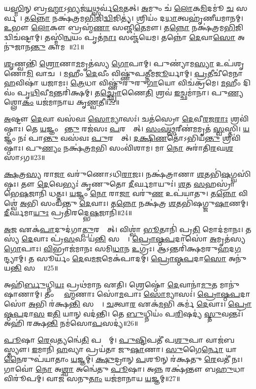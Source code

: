 𑌯\ul{𑌸𑍍𑌮𑌿}𑌨𑍍 𑌬𑍍𑌰\ul{𑌹𑍍𑌮𑌾}\-𑌽𑌭𑍍𑌯𑌜॑\ul{𑌯}𑌥𑍍𑌸𑌰𑍍𑌵॑\ul{𑌮𑍇}𑌤𑌤𑍍।
\ul{𑌅}𑌮𑍁𑌂 𑌚॑ \ul{𑌲𑍋}𑌕\ul{𑌮𑌿}𑌦𑌮𑍂॑ \ul{𑌚} 𑌸𑌰𑍍𑌵𑌮𑍍᳚।
𑌤\ul{𑌨𑍍𑌨𑍋} 𑌨𑌕𑍍𑌷॑𑌤𑍍𑌰𑌮\ul{𑌭𑌿}𑌜𑌿\ul{𑌦𑍍𑌵𑌿}𑌜𑌿𑌤𑍍𑌯॑।
𑌶𑍍𑌰𑌿𑌯𑌂॑ 𑌦\ul{𑌧𑌾}𑌤𑍍𑌵𑌹𑍃॑𑌣𑍀𑌯\-𑌮𑌾𑌨𑌮𑍍।
\ul{𑌉}𑌭𑍗 \ul{𑌲𑍋}𑌕𑍗 𑌬𑍍𑌰𑌹𑍍𑌮॑\ul{𑌣𑌾} 𑌸𑌞𑍍𑌜𑌿॑\ul{𑌤𑍇}𑌮𑍗।
𑌤\ul{𑌨𑍍𑌨𑍋} 𑌨𑌕𑍍𑌷॑𑌤𑍍𑌰𑌮\ul{𑌭𑌿}𑌜𑌿𑌦𑍍𑌵𑌿𑌚॑𑌷𑍍𑌟𑌾𑌮𑍍।
𑌤𑌸𑍍𑌮𑌿॑\ul{𑌨𑍍𑌵}𑌯𑌂 𑌪𑍃𑌤॑\ul{𑌨𑌾𑌃} 𑌸𑌞𑍍𑌜॑𑌯𑍇𑌮।
𑌤𑌨𑍍𑌨𑍋॑ \ul{𑌦𑍇}𑌵𑌾\ul{𑌸𑍋} 𑌅𑌨𑍁॑𑌜𑌾𑌨\ul{𑌨𑍍𑌤𑍁} 𑌕𑌾𑌮𑌮𑍍᳚॥21॥ 

\ul{𑌶𑍃}𑌣𑍍𑌵𑌨𑍍𑌤𑌿॑ \ul{𑌶𑍍𑌰𑍋}𑌣𑌾\ul{𑌮}𑌮𑍃𑌤॑𑌸𑍍𑌯 \ul{𑌗𑍋}𑌪𑌾𑌮𑍍।
𑌪𑍁𑌣𑍍𑌯𑌾॑𑌮\ul{𑌸𑍍𑌯𑌾} 𑌉𑌪॑𑌶𑍃𑌣𑍋\ul{𑌮𑌿} 𑌵𑌾𑌚𑌮𑍍᳚।
\ul{𑌮}𑌹𑍀𑌂 \ul{𑌦𑍇}𑌵𑍀𑌂 𑌵𑌿𑌷𑍍𑌣𑍁॑𑌪𑌤𑍍𑌨𑍀𑌮\ul{𑌜𑍂}𑌰𑍍𑌯𑌾𑌮𑍍।
\ul{𑌪𑍍𑌰}𑌤𑍀𑌚𑍀॑𑌮𑍇𑌨𑌾 \ul{𑌹}𑌵𑌿𑌷𑌾॑ 𑌯𑌜𑌾𑌮𑌃।
\ul{𑌤𑍍𑌰𑍇}𑌧𑌾 𑌵𑌿𑌷𑍍𑌣𑍁॑𑌰𑍁𑌰𑍁\ul{𑌗𑌾}𑌯𑍋 𑌵𑌿𑌚॑𑌕𑍍𑌰𑌮𑍇।
\ul{𑌮}𑌹𑍀𑌂 𑌦𑌿𑌵𑌂॑ 𑌪𑍃\ul{𑌥𑌿}𑌵𑍀\ul{𑌮}𑌨𑍍𑌤𑌰𑌿॑𑌕𑍍𑌷𑌮𑍍।
𑌤\ul{𑌚𑍍𑌛𑍍𑌰𑍋}𑌣𑍈\ul{𑌤𑌿} 𑌶𑍍𑌰𑌵॑ \ul{𑌇}𑌚𑍍𑌛𑌮𑌾॑𑌨𑌾।
𑌪𑍁\ul{𑌣𑍍𑌯}\ul{} 𑌶𑍍𑌲𑍋\ul{𑌕𑌂} 𑌯𑌜॑𑌮𑌾𑌨𑌾𑌯 𑌕𑍃\ul{𑌣𑍍𑌵}𑌤𑍀॥22॥ 

\ul{𑌅}𑌷𑍍𑌟𑍗 \ul{𑌦𑍇}𑌵𑌾 𑌵𑌸॑𑌵𑌃 \ul{𑌸𑍋}𑌮𑍍𑌯𑌾𑌸𑌃॑।
𑌚𑌤॑𑌸𑍍𑌰𑍋 \ul{𑌦𑍇}𑌵𑍀\ul{𑌰}𑌜\ul{𑌰𑌾𑌃} 𑌶𑍍𑌰𑌵𑌿॑𑌷𑍍𑌠𑌾𑌃।
𑌤𑍇 \ul{𑌯}𑌜𑍍𑌞𑌂 𑌪𑌾᳚\ul{𑌨𑍍𑌤𑍁} 𑌰𑌜॑𑌸𑌃 \ul{𑌪}𑌰𑌸𑍍𑌤𑌾᳚𑌤𑍍।
\ul{𑌸𑌂}\ul{𑌵}\ul{𑌥𑍍𑌸}𑌰𑍀𑌣॑\ul{𑌮}𑌮𑍃𑌤॑ \ul{𑌸𑍍𑌵}𑌸𑍍𑌤𑌿।
\ul{𑌯}𑌜𑍍𑌞𑌂 𑌨𑌃॑ 𑌪𑌾\ul{𑌨𑍍𑌤𑍁} 𑌵𑌸॑𑌵𑌃 \ul{𑌪𑍁}𑌰𑌸𑍍𑌤𑌾᳚𑌤𑍍।
\ul{𑌦}\ul{𑌕𑍍𑌷𑌿}\ul{𑌣}𑌤𑍋॑𑌽𑌭𑌿𑌯॑\ul{𑌨𑍍𑌤𑍁} 𑌶𑍍𑌰𑌵𑌿॑𑌷𑍍𑌠𑌾𑌃।
𑌪𑍁\ul{𑌣𑍍𑌯𑌂} 𑌨𑌕𑍍𑌷॑𑌤𑍍𑌰\ul{𑌮}𑌭𑌿 𑌸𑌂𑌵𑌿॑𑌶𑌾𑌮।
𑌮𑌾 \ul{𑌨𑍋} 𑌅𑌰𑌾॑𑌤𑌿\ul{𑌰}𑌘\ul{𑌶}\ul{}𑌸𑌾𑌽𑌗\sn{}॥23॥ 

\ul{𑌕𑍍𑌷}𑌤𑍍𑌰\ul{𑌸𑍍𑌯} 𑌰𑌾\ul{𑌜𑌾} 𑌵𑌰𑍁॑𑌣𑍋𑌽𑌧𑌿\ul{𑌰𑌾}𑌜𑌃।
𑌨𑌕𑍍𑌷॑𑌤𑍍𑌰𑌾𑌣𑌾 \ul{𑌶}𑌤𑌭𑌿॑\ul{𑌷}𑌗𑍍𑌵𑌸𑌿॑𑌷𑍍𑌠𑌃।
𑌤𑍗 \ul{𑌦𑍇}𑌵𑍇𑌭𑍍𑌯𑌃॑ 𑌕𑍃𑌣𑍁𑌤𑍋 \ul{𑌦𑍀}𑌰𑍍𑌘𑌮𑌾𑌯𑍁𑌃॑।
\ul{𑌶}𑌤 \ul{𑌸}𑌹𑌸𑍍𑌰𑌾॑ 𑌭𑍇\ul{𑌷}𑌜𑌾𑌨𑌿॑ 𑌧𑌤𑍍𑌤𑌃।
\ul{𑌯}𑌜𑍍𑌞𑌂 \ul{𑌨𑍋} 𑌰𑌾\ul{𑌜𑌾} 𑌵𑌰𑍁॑\ul{𑌣} 𑌉𑌪॑𑌯𑌾𑌤𑍁।
𑌤\ul{𑌨𑍍𑌨𑍋} 𑌵𑌿𑌶𑍍𑌵𑍇॑ \ul{𑌅}𑌭𑌿 𑌸𑌂𑌯॑𑌨𑍍𑌤𑍁 \ul{𑌦𑍇}𑌵𑌾𑌃।
𑌤\ul{𑌨𑍍𑌨𑍋} 𑌨𑌕𑍍𑌷॑𑌤𑍍𑌰 \ul{𑌶}𑌤𑌭𑌿॑𑌷𑌗𑍍𑌜𑍁\ul{𑌷𑌾}𑌣𑌮𑍍।
\ul{𑌦𑍀}𑌰𑍍𑌘𑌮𑌾\ul{𑌯𑍁𑌃} 𑌪𑍍𑌰𑌤𑌿॑𑌰𑌦𑍍𑌭𑍇\ul{𑌷}𑌜𑌾𑌨𑌿॑॥24॥ 

\ul{𑌅}𑌜 𑌏𑌕॑\ul{𑌪𑌾}𑌦𑍁𑌦॑𑌗𑌾\ul{𑌤𑍍𑌪𑍁}𑌰𑌸𑍍𑌤𑌾᳚𑌤𑍍।
𑌵𑌿𑌶𑍍𑌵𑌾॑ \ul{𑌭𑍂}𑌤𑌾𑌨𑌿॑ 𑌪𑍍𑌰\ul{𑌤𑌿} 𑌮𑍋𑌦॑𑌮𑌾𑌨𑌃।
𑌤𑌸𑍍𑌯॑ \ul{𑌦𑍇}𑌵𑌾𑌃 𑌪𑍍𑌰॑\ul{𑌸}𑌵𑌂 𑌯॑\ul{𑌨𑍍𑌤𑌿} 𑌸𑌰𑍍𑌵𑍇᳚।
\ul{𑌪𑍍𑌰𑍋}\ul{𑌷𑍍𑌠}\ul{𑌪}𑌦𑌾𑌸𑍋॑ \ul{𑌅}𑌮𑍃𑌤॑𑌸𑍍𑌯 \ul{𑌗𑍋}𑌪𑌾𑌃।
\ul{𑌵𑌿}𑌭𑍍𑌰𑌾𑌜॑𑌮𑌾𑌨𑌃 𑌸𑌮𑌿\ul{𑌧𑌾}𑌨 \ul{𑌉}𑌗𑍍𑌰𑌃।
𑌆𑌽𑌨𑍍𑌤𑌰𑌿॑𑌕𑍍𑌷𑌮𑌰𑍁\ul{𑌹}𑌦\ul{𑌗}𑌨𑍍𑌦𑍍𑌯𑌾𑌮𑍍।
𑌤 𑌸𑍂𑌰𑍍𑌯𑌂॑ \ul{𑌦𑍇}𑌵\ul{𑌮}𑌜𑌮𑍇𑌕॑𑌪𑌾𑌦𑌮𑍍।
\ul{𑌪𑍍𑌰𑍋}\ul{𑌷𑍍𑌠}\ul{𑌪}𑌦𑌾\ul{𑌸𑍋} 𑌅𑌨𑍁॑𑌯\ul{𑌨𑍍𑌤𑌿} 𑌸𑌰𑍍𑌵𑍇᳚॥25॥ 

𑌅𑌹𑌿॑\ul{𑌰𑍍𑌬𑍁}𑌧𑍍𑌨𑌿\ul{𑌯𑌃} 𑌪𑍍𑌰𑌥॑𑌮𑌾𑌨 𑌏𑌤𑌿।
𑌶𑍍𑌰𑍇𑌷𑍍𑌠𑍋॑ \ul{𑌦𑍇}𑌵𑌾𑌨𑌾॑\ul{𑌮𑍁}𑌤 𑌮𑌾𑌨𑍁॑𑌷𑌾𑌣𑌾𑌮𑍍।
𑌤𑌂 𑌬𑍍𑌰𑌾᳚\ul{𑌹𑍍𑌮}𑌣𑌾𑌃 𑌸𑍋॑\ul{𑌮}𑌪𑌾𑌃 \ul{𑌸𑍋}𑌮𑍍𑌯𑌾𑌸𑌃॑।
\ul{𑌪𑍍𑌰𑍋}\ul{𑌷𑍍𑌠}\ul{𑌪}𑌦𑌾𑌸𑍋॑ \ul{𑌅}𑌭𑌿 𑌰॑𑌕𑍍𑌷\ul{𑌨𑍍𑌤𑌿} 𑌸𑌰𑍍𑌵𑍇᳚।
\ul{𑌚}𑌤𑍍𑌵𑌾\ul{𑌰} 𑌏𑌕॑\ul{𑌮}𑌭𑌿 𑌕𑌰𑍍𑌮॑ \ul{𑌦𑍇}𑌵𑌾𑌃।
\ul{𑌪𑍍𑌰𑍋}\ul{𑌷𑍍𑌠}\ul{𑌪}𑌦𑌾\ul{𑌸} 𑌇\ul{𑌤𑌿} 𑌯𑌾𑌨𑍍 𑌵𑌦॑𑌨𑍍𑌤𑌿।
𑌤𑍇 \ul{𑌬𑍁}𑌧𑍍𑌨𑌿𑌯𑌂॑ 𑌪\ul{𑌰𑌿}𑌷𑌦𑍍𑌯॑ \ul{𑌸𑍍𑌤𑍁}𑌵𑌨𑍍𑌤𑌃॑।
𑌅𑌹𑌿॑ 𑌰𑌕𑍍𑌷\ul{𑌨𑍍𑌤𑌿} 𑌨𑌮॑𑌸𑍋\ul{𑌪}𑌸𑌦𑍍𑌯॑॥26॥ 

\ul{𑌪𑍂}𑌷𑌾 \ul{𑌰𑍇}𑌵𑌤𑍍𑌯𑌨𑍍𑌵𑍇॑\ul{𑌤𑌿} 𑌪𑌨𑍍𑌥𑌾᳚𑌮𑍍।
\ul{𑌪𑍁}\ul{𑌷𑍍𑌟𑌿}𑌪𑌤𑍀॑ 𑌪\ul{𑌶𑍁}𑌪𑌾 𑌵𑌾𑌜॑𑌬𑌸𑍍𑌤𑍍𑌯𑍗।
\ul{𑌇}𑌮𑌾𑌨𑌿॑ \ul{𑌹}𑌵𑍍𑌯𑌾 𑌪𑍍𑌰𑌯॑𑌤𑌾 𑌜𑍁\ul{𑌷𑌾}𑌣𑌾।
\ul{𑌸𑍁}𑌗𑍈\ul{𑌰𑍍𑌨𑍋} 𑌯𑌾\ul{𑌨𑍈}𑌰𑍁𑌪॑𑌯𑌾𑌤𑌾𑌂 \ul{𑌯}𑌜𑍍𑌞𑌮𑍍।
\ul{𑌕𑍍𑌷𑍁}𑌦𑍍𑌰𑌾𑌨𑍍 \ul{𑌪}𑌶𑍂𑌨𑍍 𑌰॑𑌕𑍍𑌷𑌤𑍁 \ul{𑌰𑍇}𑌵𑌤𑍀॑ 𑌨𑌃।
𑌗𑌾𑌵𑍋॑ \ul{𑌨𑍋} 𑌅\ul{𑌶𑍍𑌵𑌾}\ul{} 𑌅𑌨𑍍𑌵𑍇॑𑌤𑍁 \ul{𑌪𑍂}𑌷𑌾।
𑌅\ul{𑌨𑍍𑌨}\ul{} 𑌰𑌕𑍍𑌷॑𑌨𑍍𑌤𑍗 𑌬\ul{𑌹𑍁}𑌧𑌾 𑌵𑌿𑌰𑍂॑𑌪𑌮𑍍।
𑌵𑌾𑌜॑ 𑌸𑌨𑍁\ul{𑌤𑌾𑌂} 𑌯𑌜॑𑌮𑌾𑌨𑌾𑌯 \ul{𑌯}𑌜𑍍𑌞𑌮𑍍॥27॥ 

